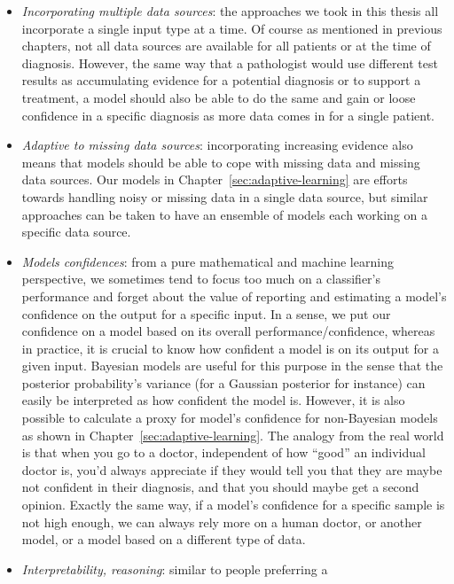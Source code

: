 \begin{itemize}
  \item \emph{Incorporating multiple data sources}: the approaches we took in
    this thesis all incorporate a single input type at a time. Of course as
    mentioned in previous chapters, not all data sources are available for all
    patients or at the time of diagnosis. However, the same way that a
    pathologist would use different test results as accumulating evidence for a
    potential diagnosis or to support a treatment, a model should also be able
    to do the same and gain or loose confidence in a specific diagnosis as more
    data comes in for a single patient.
  \item \emph{Adaptive to missing data sources}: incorporating increasing
    evidence also means that models should be able to cope with missing data
    and missing data sources. Our models in Chapter~\ref{sec:adaptive-learning}
    are efforts towards handling noisy or missing data in a single data source,
    but similar approaches can be taken to have an ensemble of models each
    working on a specific data source.
  \item \emph{Models confidences}: from a pure mathematical and machine
    learning perspective, we sometimes tend to focus too much on a classifier's
    performance and forget about the value of reporting and estimating a
    model's confidence on the output for a specific input. In a sense, we put
    our confidence on a model based on its overall performance/confidence,
    whereas in practice, it is crucial to know how confident a model is on its
    output for a given input. Bayesian models are useful for this purpose in
    the sense that the posterior probability's variance (for a Gaussian
    posterior for instance) can easily be interpreted as how confident the
    model is. However, it is also possible to calculate a proxy for model's
    confidence for non-Bayesian models as shown in
    Chapter~\ref{sec:adaptive-learning}. The analogy from the real world is
    that when you go to a doctor, independent of how ``good'' an individual
    doctor is, you'd always appreciate if they would tell you that they are
    maybe not confident in their diagnosis, and that you should maybe get a
    second opinion. Exactly the same way, if a model's confidence for a specific
    sample is not high enough, we can always rely more on a human doctor, or
    another model, or a model based on a different type of data.
  \item \emph{Interpretability, reasoning}: similar to people preferring a

\end{itemize}
